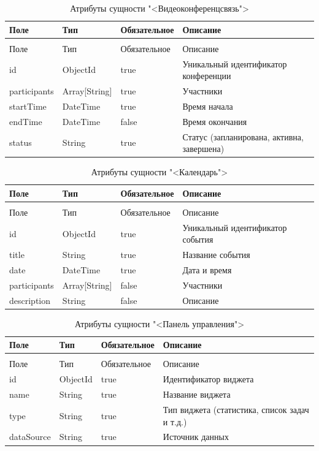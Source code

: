 \begin{xltabular}{\textwidth}{|l|l|p{3.2cm}|X|}
  \caption{Атрибуты сущности "<Видеоконференцсвязь">\label{video:table}}\\ \hline
  Поле & Тип & Обязательное & Описание \\ \hline
  \endfirsthead
  \\ \hline
  Поле & Тип & Обязательное & Описание \\ \hline
  \endhead
  id & ObjectId & true & Уникальный идентификатор конференции \\ \hline
  participants & Array[String] & true & Участники \\ \hline
  startTime & DateTime & true & Время начала \\ \hline
  endTime & DateTime & false & Время окончания \\ \hline
  status & String & true & Статус (запланирована, активна, завершена) \\ \hline
\end{xltabular}

\begin{xltabular}{\textwidth}{|l|l|p{3.2cm}|X|}
  \caption{Атрибуты сущности "<Календарь">\label{calendar:table}}\\ \hline
  Поле & Тип & Обязательное & Описание \\ \hline
  \endfirsthead
  \\ \hline
  Поле & Тип & Обязательное & Описание \\ \hline
  \endhead
  id & ObjectId & true & Уникальный идентификатор события \\ \hline
  title & String & true & Название события \\ \hline
  date & DateTime & true & Дата и время \\ \hline
  participants & Array[String] & false & Участники \\ \hline
  description & String & false & Описание \\ \hline
\end{xltabular}

\begin{xltabular}{\textwidth}{|l|l|p{3.2cm}|X|}
  \caption{Атрибуты сущности "<Панель управления">\label{dashboard:table}}\\ \hline
  Поле & Тип & Обязательное & Описание \\ \hline
  \endfirsthead
  \\ \hline
  Поле & Тип & Обязательное & Описание \\ \hline
  \endhead
  id & ObjectId & true & Идентификатор виджета \\ \hline
  name & String & true & Название виджета \\ \hline
  type & String & true & Тип виджета (статистика, список задач и т.д.) \\ \hline
  dataSource & String & true & Источник данных \\ \hline
\end{xltabular}

